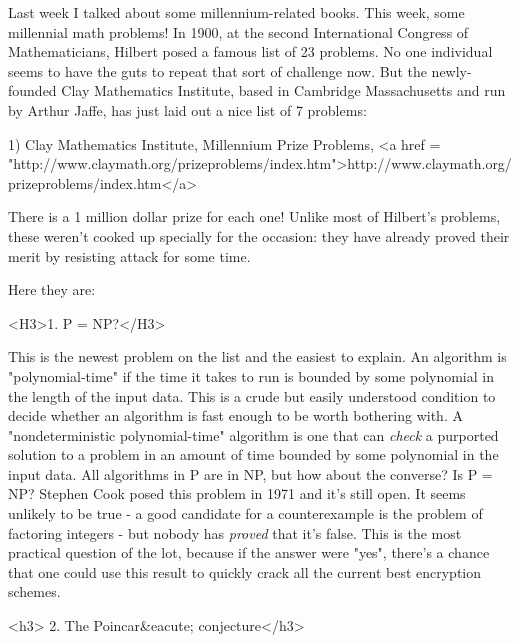 

 

Last week I talked about some millennium-related books.  This week, some
millennial math problems!  In 1900, at the second International Congress
of Mathematicians, Hilbert posed a famous list of 23 problems.  No one
individual seems to have the guts to repeat that sort of challenge now. 
But the newly-founded Clay Mathematics Institute, based in Cambridge
Massachusetts and run by Arthur Jaffe, has just laid out a nice list of
7 problems:

1) Clay Mathematics Institute, Millennium Prize Problems, 
<a href = "http://www.claymath.org/prizeproblems/index.htm">http://www.claymath.org/prizeproblems/index.htm</a>

There is a 1 million dollar prize for each one!  Unlike most of Hilbert's 
problems, these weren't cooked up specially for the occasion: they have 
already proved their merit by resisting attack for some time.  

Here they are:

<H3>1. P = NP?</H3>


This is the newest problem on the list and the easiest
to explain. An algorithm is "polynomial-time" 
if the time it takes to run
is bounded by some polynomial in the length of the input data. This is
a crude but easily understood condition to decide whether an algorithm
is fast enough to be worth bothering with. A 
"nondeterministic polynomial-time"
algorithm is one that can \emph{check} a purported solution to a problem in
an amount of time bounded by some polynomial in the input data. All algorithms
in P are in NP, but how about the converse? Is P = NP? Stephen Cook posed
this problem in 1971 and it's still open. It seems unlikely to be true
- a good candidate for a counterexample is the problem of factoring integers
- but nobody has \emph{proved} that it's false. This is the most practical 
question
of the lot, because if the answer were "yes", 
there's a chance that one could use this result to quickly crack 
all the current best encryption schemes.

<h3> 2. The Poincar&eacute; conjecture</h3>

